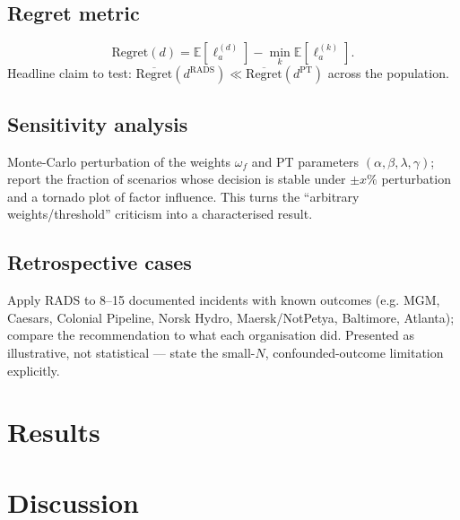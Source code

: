 \documentclass[jcp,article,submit,pdftex,moreauthors]{Definitions/mdpi}
\begin{document}
\subsection{Regret metric}
\begin{equation}\label{eq:regret}
\mathrm{Regret}(d)=\mathbb{E}\!\left[\ell_a^{(d)}\right]-\min_k \mathbb{E}\!\left[\ell_a^{(k)}\right].
\end{equation}
Headline claim to test: $\overline{\mathrm{Regret}}(d^{\mathrm{RADS}})\ll
\overline{\mathrm{Regret}}(d^{\mathrm{PT}})$ across the population.

\subsection{Sensitivity analysis}
Monte-Carlo perturbation of the weights $\omega_f$ and PT parameters
$(\alpha,\beta,\lambda,\gamma)$; report the fraction of scenarios whose decision
is stable under $\pm x\%$ perturbation and a tornado plot of factor influence.
This turns the ``arbitrary weights/threshold'' criticism into a characterised
result.

\subsection{Retrospective cases}
Apply RADS to 8--15 documented incidents with known outcomes (e.g. MGM,
Caesars, Colonial Pipeline, Norsk Hydro, Maersk/NotPetya, Baltimore, Atlanta);
compare the recommendation to what each organisation did. Presented as
illustrative, not statistical --- state the small-$N$, confounded-outcome
limitation explicitly.

\section{Results}\label{sec:results}

\section{Discussion}\label{sec:discussion}
\end{document}
